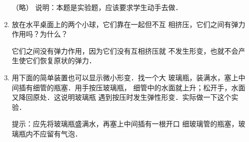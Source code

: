 \begin{enumerate}
  \begin{solution}
    （略）
    说明：本题是实验题，应该要求学生动手去做．
  \end{solution}
 \item 放在水平桌面上的两个小球，它们靠在一起但不互
相挤压，它们之间有弹力作用吗？为什么？

\begin{solution}
    它们之间没有弹力作用，因为它们没有互相挤压就
不发生形变，也就不会产生使它们恢复原状的弹力．
\end{solution}
\item 用下面的简单装置也可以显示微小形变．找一个大
玻璃瓶，装满水，塞上中间插有细管的瓶塞．用手按压玻璃瓶，
细管中的水面就上升；松开手，水面又降回原处．这说明玻璃瓶
遇到按压时发生弹性形变．实际做一下这个实验．

\begin{solution}
    提示：应先将玻璃瓶盛满水，再塞上中间插有一根开口
细玻璃管的瓶塞，玻璃瓶内不应留有气泡．
\end{solution}
\end{enumerate}

